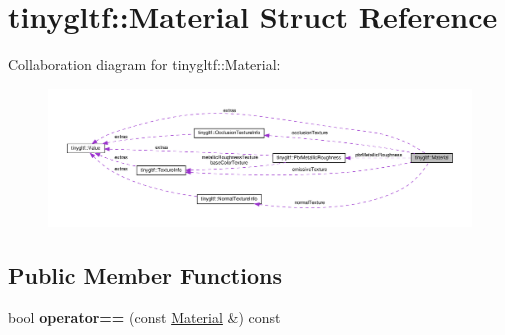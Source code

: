 \hypertarget{structtinygltf_1_1Material}{}\section{tinygltf\+:\+:Material Struct Reference}
\label{structtinygltf_1_1Material}


Collaboration diagram for tinygltf\+:\+:Material\+:\nopagebreak
\begin{figure}[H]
\begin{center}
\leavevmode
\includegraphics[width=350pt]{structtinygltf_1_1Material__coll__graph}
\end{center}
\end{figure}
\subsection*{Public Member Functions}
\begin{DoxyCompactItemize}
\item 
\mbox{\label{structtinygltf_1_1Material_ab3e45d786d416f6140146592eacc3c46}} 
bool {\bfseries operator==} (const \hyperlink{structtinygltf_1_1Material}{Material} \&) const
\end{DoxyCompactItemize}
